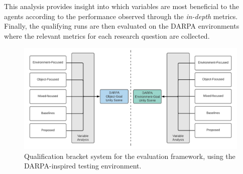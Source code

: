 This analysis provides insight into which variables are most beneficial to the agents according to the performance observed through the \textit{in-depth} metrics. 
Finally, the qualifying runs are then evaluated on the DARPA environments where the relevant metrics for each research question are collected.
\begin{figure}[!ht]
        \centering
        \includegraphics[width=1\textwidth]{images/darpa-qualification-bracket_2.pdf} 
        \caption{Qualification bracket system for the evaluation framework, using the DARPA-inspired testing environment.}
        \label{fig:darpa-bracket}
\end{figure}









